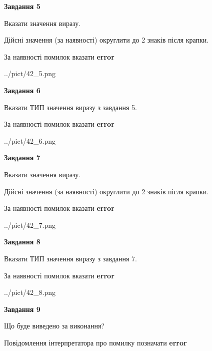 \documentclass[11pt, ukrainian]{article}
\begin{document}
{\begin {large}
{\begin {center}\textbf{Завдання 5}\end {center}}\par
Вказати значення виразу. \par
Дійсні значення (за наявності) округлити до 2 знаків після крапки. \par
За наявності помилок вказати \textbf{error}

\begin{center}
	{../pict/42_5.png}
\end{center}
\newpage

{\begin {center}\textbf{Завдання 6}\end {center}}\par
Вказати ТИП значення виразу з завдання 5. \par
За наявності помилок вказати \textbf{error}

\begin{center}
	{../pict/42_6.png}
\end{center}
\newpage

{\begin {center}\textbf{Завдання 7}\end {center}}\par
Вказати значення виразу. \par
Дійсні значення (за наявності) округлити до 2 знаків після крапки. \par
За наявності помилок вказати \textbf{error}

\begin{center}
	{../pict/42_7.png}
\end{center}
\newpage

{\begin {center}\textbf{Завдання 8}\end {center}}\par
Вказати ТИП значення виразу з завдання 7. \par
За наявності помилок вказати \textbf{error}

\begin{center}
	{../pict/42_8.png}
\end{center}
\newpage

{\begin {center}\textbf{Завдання 9}\end {center}}\par
Що буде виведено за виконання? \par
Повідомлення інтерпретатора про помилку позначати \textbf{error}


\end{large}}
\end{document}
